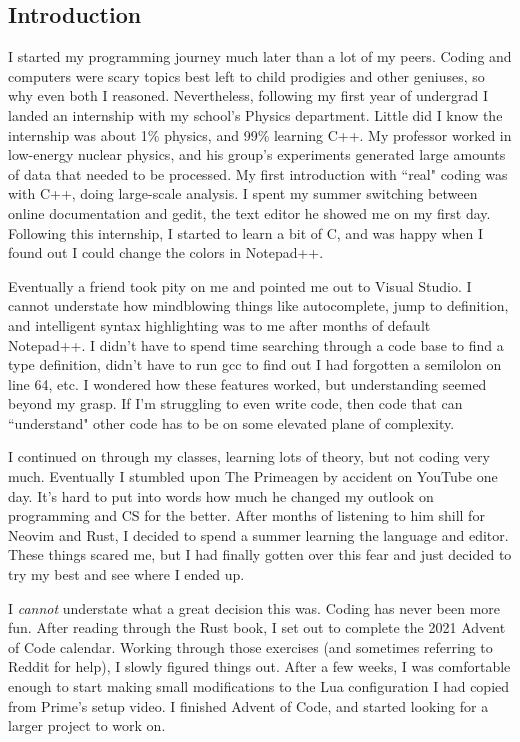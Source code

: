 \subsection{Introduction}

I started my programming journey much later than a lot of my peers.
Coding and computers were scary topics best left to child prodigies and other geniuses,
so why even both I reasoned. Nevertheless, following my first year of undergrad
I landed an internship with my school's Physics department. Little did I know the
internship was about 1\% physics, and 99\% learning C++. My professor worked in
low-energy nuclear physics, and his group's experiments generated large amounts
of data that needed to be processed. My first introduction with ``real" coding 
was with C++, doing large-scale analysis. I spent my summer switching between online
documentation and gedit, the text editor he showed me on my first day. Following
this internship, I started to learn a bit of C, and was happy when I found out
I could change the colors in Notepad++.

Eventually a friend took pity on me and pointed me out to Visual Studio. 
I cannot understate how mindblowing things like autocomplete, jump to definition, 
and intelligent syntax highlighting was to me after months of default Notepad++.
I didn't have to spend time searching through a code base to find a type definition,
didn't have to run gcc to find out I had forgotten a semilolon on line 64, etc.
I wondered how these features worked, but understanding seemed beyond my grasp. 
If I'm struggling to even write code, then code that can ``understand" other code 
has to be on some elevated plane of complexity.

I continued on through my classes, learning lots of theory, but not coding very
much. Eventually I stumbled upon The Primeagen by accident on YouTube one day. It's
hard to put into words how much he changed my outlook on programming and CS for 
the better. After months of listening to him shill for Neovim and Rust, I decided
to spend a summer learning the language and editor. These things scared me, but
I had finally gotten over this fear and just decided to try my best and see where
I ended up. 

I \textit{cannot} understate what a great decision this was. Coding has never been
more fun. After reading through the Rust book, I set out to complete the 2021 Advent
of Code calendar.  Working through those exercises (and sometimes referring to Reddit
for help), I slowly figured things out. After a few weeks, I was comfortable enough
to start making small modifications to the Lua configuration I had copied from 
Prime's setup video. I finished Advent of Code, and started looking for a larger
project to work on.

